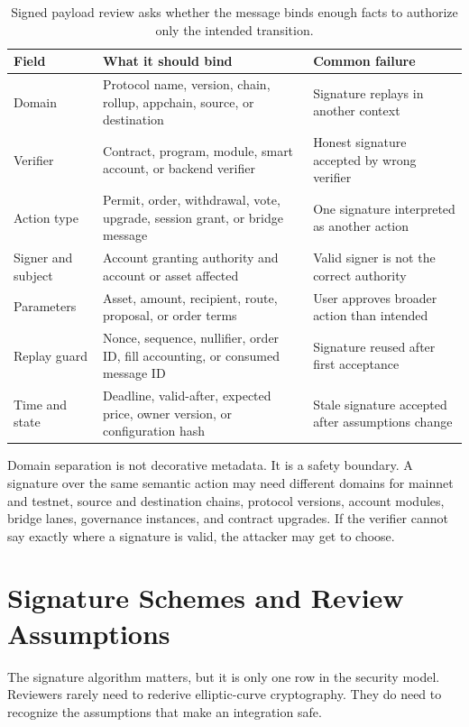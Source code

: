 \begin{table}[htbp]
\centering
\small
\renewcommand{\arraystretch}{1.18}
\begin{tabularx}{\textwidth}{@{}>{\RaggedRight\arraybackslash}p{}X>{\RaggedRight\arraybackslash}p{}@{}}
\toprule
Field & What it should bind & Common failure \\
\midrule
Domain & Protocol name, version, chain, rollup, appchain, source, or destination & Signature replays in another context \\
Verifier & Contract, program, module, smart account, or backend verifier & Honest signature accepted by wrong verifier \\
Action type & Permit, order, withdrawal, vote, upgrade, session grant, or bridge message & One signature interpreted as another action \\
Signer and subject & Account granting authority and account or asset affected & Valid signer is not the correct authority \\
Parameters & Asset, amount, recipient, route, proposal, or order terms & User approves broader action than intended \\
Replay guard & Nonce, sequence, nullifier, order ID, fill accounting, or consumed message ID & Signature reused after first acceptance \\
Time and state & Deadline, valid-after, expected price, owner version, or configuration hash & Stale signature accepted after assumptions change \\
\bottomrule
\end{tabularx}
\caption{Signed payload review asks whether the message binds enough facts to authorize only the intended transition.}
\end{table}

Domain separation is not decorative metadata. It is a safety boundary. A signature over the same semantic action may need different domains for mainnet and testnet, source and destination chains, protocol versions, account modules, bridge lanes, governance instances, and contract upgrades. If the verifier cannot say exactly where a signature is valid, the attacker may get to choose.

\section{Signature Schemes and Review Assumptions}

The signature algorithm matters, but it is only one row in the security model. Reviewers rarely need to rederive elliptic-curve cryptography. They do need to recognize the assumptions that make an integration safe.

